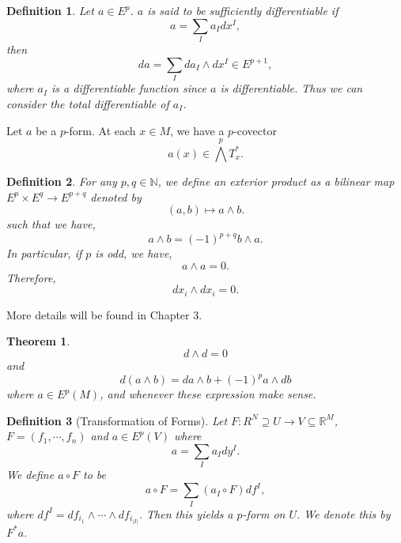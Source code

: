 \documentclass{article}
\newtheorem{theorem}{Theorem} [section]
\newtheorem{definition}{Definition}[section]
\newcommand{\N}[0]{\mathbb{N}}
\newcommand{\R}[0]{\mathbb{R}}
\begin{document}
\begin{definition}
  Let $a\in E^p$. $a$ is said to be sufficiently differentiable if 
  \begin{equation*}
    a = \sum_{I}a_Idx^I ,
  \end{equation*}
  then 
  \begin{equation*}
    da = \sum_I da_I\wedge dx^I \in E^{p+1},
  \end{equation*}
  where $a_I$ is a differentiable function since $a$ is differentiable. Thus we can consider the total differentiable of $a_I$.
\end{definition}

Let $a$ be a $p$-form. At each $x\in M$, we have a $p$-covector 
\begin{equation*}
  a(x) \in\bigwedge^p T_x^*.
\end{equation*}

\begin{definition}
  For any $p,q\in\N$, we define an exterior product as a bilinear map $E^p\times E^q\to E^{p+q}$ denoted by
  \begin{equation*}
    (a,b)\mapsto a\wedge b.
  \end{equation*}
  such that we have,
  \begin{equation*}
    a\wedge b = (-1)^{p+q}b\wedge a.
  \end{equation*}
  In particular, if $p$ is odd, we have,
  \begin{equation*}
    a\wedge a = 0.
  \end{equation*}
  Therefore,
  \begin{equation*}
    dx_i\wedge dx_i = 0.
  \end{equation*}
\end{definition}

More details will be found in \cite{Lieb}Chapter 3.

\begin{theorem}
  \begin{equation*}
    d\wedge d = 0
  \end{equation*}
  and 
  \begin{equation*}
    d(a\wedge b) = da\wedge b + (-1)^pa\wedge db
  \end{equation*}
  where $a\in E^p(M)$, and whenever these expression make sense.
\end{theorem}

\begin{definition}[Transformation of Forms]

  Let $F:R^N\supseteq U\to V\subseteq \R^M$, $F=(f_1,\cdots,f_n)$ and $a\in E^p(V)$ where 
  \begin{equation*}
    a = \sum_{I}a_I dy^I.
  \end{equation*}
  We define $a\circ F$ to be 
  \begin{equation*}
    a\circ F = \sum_I (a_I\circ F) df^I,
  \end{equation*}
  where $df^I = df_{i_1}\wedge\cdots\wedge df_{i_{\vert I\vert}}$. Then this yields a $p$-form on $U$. We denote this by $F^*a$.
\end{definition}
\end{document}

